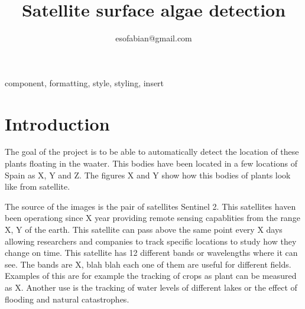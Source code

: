 \documentclass[conference]{IEEEtran}
\begin{document}
    \title{Satellite surface algae detection}

    \author{
    esofabian@gmail.com}

    \maketitle

    \begin{abstract}
        \lipsum[1]
    \end{abstract}

    \begin{IEEEkeywords}
        component, formatting, style, styling, insert
    \end{IEEEkeywords}


    \section{Introduction}
    The goal of the project is to be able to automatically detect the location of these plants
    floating in the waater.
    This bodies have been located in a few locations of Spain as X, Y and Z. The figures X and Y
    show how this bodies of plants look like from satellite.

    The source of the images is the pair of satellites Sentinel 2. This satellites haven been operationg since X year
    providing remote sensing capablities from the range X, Y of the earth.
    This satellite can pass above the same point every X days allowing researchers and companies to
    track specific locations to study how they change on time.
    This satellite has 12 different bands or wavelengths where it can see. The bands are X, blah blah
    each one of them are useful for different fields.
    Examples of this are for example the tracking of crops as plant can be measured as X.
    Another use is the tracking of water levels of different lakes or the effect of flooding and
    natural catastrophes.
\end{document}
